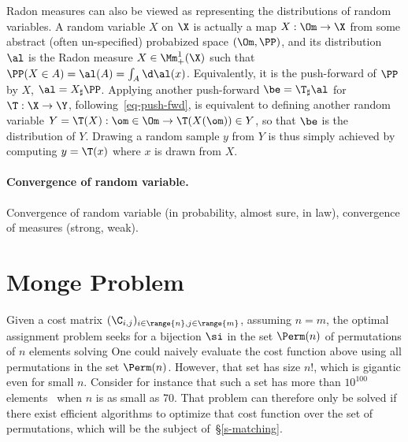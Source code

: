 \begin{rem}
	Radon measures can also be viewed as representing the distributions of random variables. A random variable $X$ on $\X$ is actually a map $X : \Om \rightarrow \X$ from some abstract (often un-specified) probabized space $(\Om,\PP)$, and its distribution $\al$ is the Radon measure $X \in \Mm_+^1(\X)$ such that $\PP(X \in A) = \al(A)=\int_A \d\al(x)$.
	Equivalently, it is the push-forward of $\PP$ by $X$, $\al=X_\sharp\PP$.
	Applying another push-forward $\be = \T_\sharp\al$ for $\T : \X \rightarrow \Y$, following~\eqref{eq-push-fwd}, is equivalent to defining another random variable $Y=\T(X) : \om \in \Om \rightarrow \T(X(\om)) \in Y$, so that $\be$ is the distribution of $Y$.
	Drawing a random sample $y$ from $Y$ is thus simply achieved by computing $y=\T(x)$ where $x$ is drawn from $X$.  
\end{rem}


\paragraph{Convergence of random variable.}

Convergence of random variable (in probability, almost sure, in law), convergence of measures (strong, weak).


\section{Monge Problem}

Given a cost matrix $(\C_{i,j})_{i \in \range{n}, j \in \range{m}}$, assuming $n=m$, the optimal assignment problem seeks for a bijection $\si$ in the set $\Perm(n)$ of permutations of $n$ elements solving
One could naively evaluate the cost function above using all permutations in the set $\Perm(n)$. However, that set has size $n!$, which is gigantic even for small $n$. Consider for instance that such a set has more than $10^{100}$ elements~\cite{Dantzig1983} when $n$ is as small as 70. That problem can therefore only be solved if there exist efficient algorithms to optimize that cost function over the set of permutations, which will be the subject of~\S\ref{s-matching}.

